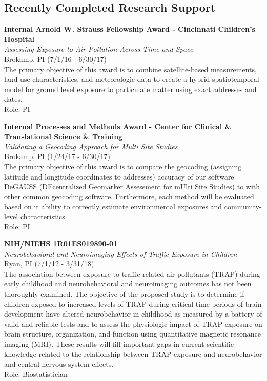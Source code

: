 \documentclass{nihbiosketch}
\begin{document}
\bigskip


\subsection*{Recently Completed Research Support}

\bigskip

\textbf{Internal Arnold W. Strauss Fellowship Award - Cincinnati
	Children's Hospital}\\
\emph{Assessing Exposure to Air Pollution Across Time and Space}\\
Brokamp, PI (7/1/16 - 6/30/17)\\
The primary objective of this award is to combine satellite-based
measurements, land use characteristics, and meteorologic data to create
a hybrid spatiotemporal model for ground level exposure to particulate
matter using exact addresses and dates.\\
Role: PI

\bigskip

\textbf{Internal Processes and Methods Award - Center for Clinical \&
	Translational Science \& Training}\\
\emph{Validating a Geocoding Approach for Multi Site Studies}\\
Brokamp, PI (1/24/17 - 6/30/17)\\
The primary objective of this award is to compare the geocoding
(assigning latitude and longitude coordinates to addresses) accuracy of
our software DeGAUSS (DEcentralized Geomarker Assessment for mUlti Site
Studies) to with other common geocoding software. Furthermore, each
method will be evaluated based on it ability to correctly estimate
environmental exposures and community-level characteristics.\\
Role: PI

\bigskip

\textbf{NIH/NIEHS 1R01ES019890-01}\\
\emph{Neurobehavioral and Neuroimaging Effects of Traffic Exposure in
	Children}\\
Ryan, PI (7/1/12 - 3/31/18)\\
The association between exposure to traffic-related air pollutants
(TRAP) during early childhood and neurobehavioral and neuroimaging
outcomes has not been thoroughly examined. The objective of the proposed
study is to determine if children exposed to increased levels of TRAP
during critical time periods of brain development have altered
neurobehavior in childhood as measured by a battery of valid and
reliable tests and to assess the physiologic impact of TRAP exposure on
brain structure, organization, and function using quantitative magnetic
resonance imaging (MRI). These results will fill important gaps in
current scientific knowledge related to the relationship between TRAP
exposure and neurobehavior and central nervous system effects.\\
Role: Biostatistician
\end{document}
